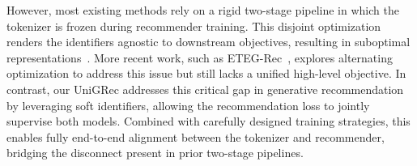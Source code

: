 However, most existing methods rely on a rigid two-stage pipeline in which the tokenizer is frozen during recommender training. This disjoint optimization renders the identifiers agnostic to downstream objectives, resulting in suboptimal representations~\cite{BLOGER}. More recent work, such as ETEG-Rec~\cite{ETEGRec}, explores alternating optimization to address this issue but still lacks a unified high-level objective. In contrast, our UniGRec addresses this critical gap in generative recommendation by leveraging soft identifiers, allowing the recommendation loss to jointly supervise both models. Combined with carefully designed training strategies, this enables fully end-to-end alignment between the tokenizer and recommender, bridging the disconnect present in prior two-stage pipelines.